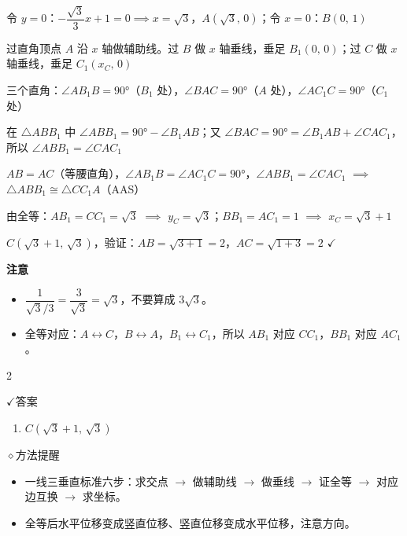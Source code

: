 \documentclass{exam-zh}
\newcommand{\eduSubTitle}[1]{%
  \needspace{4\baselineskip}%
  \vspace{1mm}
  {\color{edu-blue}\bfseries #1}\par
  \vspace{1mm}
}
\newcommand{\eduIconCheck}{\(\checkmark\)}
\newcommand{\eduIconPin}{\(\diamond\)}
\newenvironment{eduBulletList}{%
  \begin{itemize}[
    label=\textbullet,
    leftmargin=5mm,
    itemsep=1.2mm,
    topsep=0pt,
    parsep=0pt
  ]
}{%
  \end{itemize}
}
\newenvironment{eduBottomGrid}{%
  \columnratio{0.32, 0.68}%
  \setlength{\columnsep}{11mm}%
  \columnseprule=0.35pt%
  \colseprulecolor{edu-line}%
  \begin{paracol}{2}%
}{%
  \end{paracol}%
}
\newenvironment{eduSummaryLeft}{%
}{%
}
\newcommand{\eduSummaryDivider}{%
  \switchcolumn
}
\newenvironment{eduSummaryRight}{%
}{%
}
\newenvironment{eduPlainList}{%
  \begin{enumerate}[
    label=(\arabic*),
    leftmargin=7mm,
    itemsep=1.2mm,
    topsep=0pt,
    parsep=0pt
  ]
}{%
  \end{enumerate}
}
\begin{document}
\begingroup
\setlength{\parskip}{2.5mm}
令 $y = 0$：$-\dfrac{\sqrt{3}}{3}x + 1 = 0 \implies x = \sqrt{3}$，$A(\sqrt{3},\,0)$；令 $x = 0$：$B(0,\,1)$\par
过直角顶点 $A$ 沿 $x$ 轴做辅助线。过 $B$ 做 $x$ 轴垂线，垂足 $B_1(0,\,0)$；过 $C$ 做 $x$ 轴垂线，垂足 $C_1(x_C,\,0)$\par
三个直角：$\angle AB_1B = 90°$（$B_1$ 处），$\angle BAC = 90°$（$A$ 处），$\angle AC_1C = 90°$（$C_1$ 处）\par
在 $\triangle ABB_1$ 中 $\angle ABB_1 = 90° - \angle B_1AB$；又 $\angle BAC = 90° = \angle B_1AB + \angle CAC_1$，所以 $\angle ABB_1 = \angle CAC_1$\par
$AB = AC$（等腰直角），$\angle AB_1B = \angle AC_1C = 90°$，$\angle ABB_1 = \angle CAC_1$ $\implies$ $\triangle ABB_1 \cong \triangle CC_1A$（AAS）\par
由全等：$AB_1 = CC_1 = \sqrt{3}$ $\implies$ $y_C = \sqrt{3}$；$BB_1 = AC_1 = 1$ $\implies$ $x_C = \sqrt{3} + 1$\par
$C(\sqrt{3}+1,\,\sqrt{3})$，验证：$AB = \sqrt{3+1} = 2$，$AC = \sqrt{1+3} = 2$ $\checkmark$\par
\endgroup

\vspace{2mm}
\eduSubTitle{注意}
\begin{eduBulletList}
  \item $\dfrac{1}{\sqrt{3}/3} = \dfrac{3}{\sqrt{3}} = \sqrt{3}$，不要算成 $3\sqrt{3}$。  \item 全等对应：$A \leftrightarrow C$，$B \leftrightarrow A$，$B_1 \leftrightarrow C_1$，所以 $AB_1$ 对应 $CC_1$，$BB_1$ 对应 $AC_1$。\end{eduBulletList}




\begin{eduBottomGrid}
  \begin{eduSummaryLeft}
    \begin{eduSummaryBlock}{\eduIconCheck}{答案}
    \begin{eduPlainList}
      \item $C(\sqrt{3}+1,\,\sqrt{3})$    \end{eduPlainList}
    \end{eduSummaryBlock}
  \end{eduSummaryLeft}
  \eduSummaryDivider
  \begin{eduSummaryRight}
    \begin{eduSummaryBlock}{\eduIconPin}{方法提醒}
    \begin{eduBulletList}
      \item 一线三垂直标准六步：求交点 $\to$ 做辅助线 $\to$ 做垂线 $\to$ 证全等 $\to$ 对应边互换 $\to$ 求坐标。      \item 全等后水平位移变成竖直位移、竖直位移变成水平位移，注意方向。    \end{eduBulletList}
    \end{eduSummaryBlock}
  \end{eduSummaryRight}
\end{eduBottomGrid}
\end{document}
